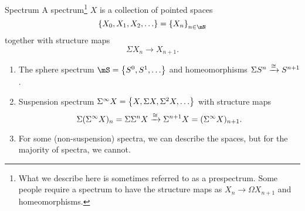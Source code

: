 \begin{definition}{Spectrum}{}
    A {spectrum}\footnote{What we describe here is sometimes referred to as a prespectrum. Some people require a spectrum to have the structure maps as $X_n\to \Omega X_{n+1}$ and homeomorphisms.} $X$ is a collection of pointed spaces $$\sets{X_0,X_1,X_2,\dots} = \sets{X_n}_{n\in \mN}$$ together with structure maps $$\Sigma X_n\to X_{n+1}.$$
\end{definition}
\begin{example}{}{}
    \begin{enumerate}
        \item The sphere spectrum $\mS = \sets{S^0,S^1,\dots}$ and homeomorphisms $\Sigma S^n\xrightarrow{\cong}S^{n+1}$. 
        \item Suspension spectrum $\Sigma^\infty X = \sets{X,\Sigma X, \Sigma^2 X,\dots}$  with structure maps $$\Sigma (\Sigma^\infty X)_n = \Sigma \Sigma^n X\xrightarrow{\cong }\Sigma^{n+1}X = (\Sigma^\infty X)_{n+1}.$$
        \item For some (non-suspension) spectra, we can describe the spaces, but for the majority of spectra, we cannot. 
    \end{enumerate}
\end{example}
\begin{center}

    \begin{center}

    \end{center}
  \end{center}

